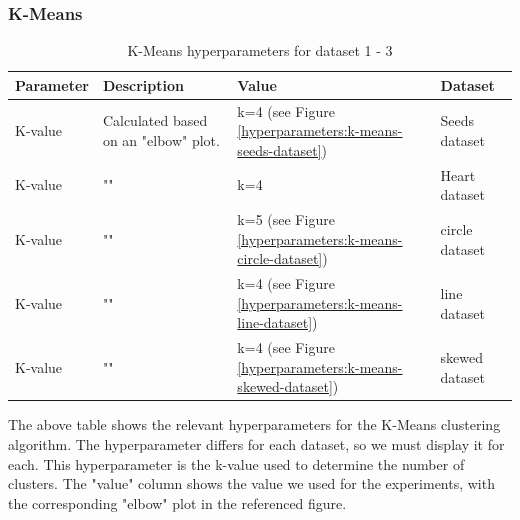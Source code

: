 \subsubsection{K-Means}
\begin{table}[h]
      \begin{tabular}{|l|p{6cm}|l|l|}
            \hline
            Parameter & Description                          & Value                                                         & Dataset        \\ \hline
            K-value   & Calculated based on an "elbow" plot. & k=4 (see Figure \ref{hyperparameters:k-means-seeds-dataset})  & Seeds dataset  \\ \hline
            K-value   & ""                                   & k=4                                                           & Heart dataset  \\ \hline
            K-value   & ""                                   & k=5 (see Figure \ref{hyperparameters:k-means-circle-dataset}) & circle dataset \\ \hline
            K-value   & ""                                   & k=4 (see Figure \ref{hyperparameters:k-means-line-dataset})   & line dataset   \\ \hline
            K-value   & ""                                   & k=4 (see Figure \ref{hyperparameters:k-means-skewed-dataset}) & skewed dataset \\ \hline
      \end{tabular}
      \caption{K-Means hyperparameters for dataset 1 - 3}
      \label{tab:kmeans-formula-dataset-2}
\end{table}
The above table shows the relevant hyperparameters for the K-Means clustering algorithm.
The hyperparameter differs for each dataset, so we must display it for each.
This hyperparameter is the k-value used to determine the number of clusters.
The "value" column shows the value we used for the experiments, with the corresponding "elbow" plot in the referenced figure.
